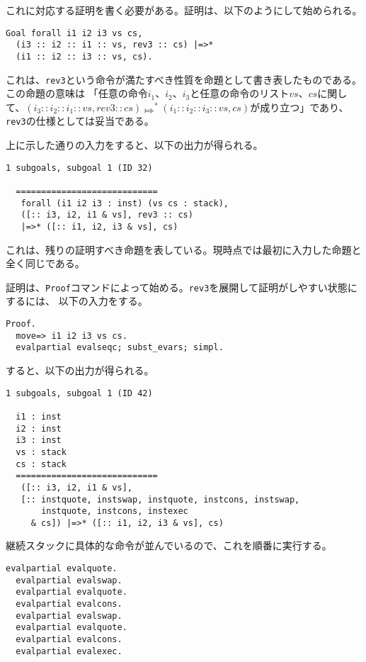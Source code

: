 \documentclass[a4paper, 10pt, twocolumn, titlepage]{ujarticle}
\renewcommand{\{}{\symbol{"7B}}
\renewcommand{\}}{\symbol{"7D}}
\begin{document}
これに対応する証明を書く必要がある。証明は、以下のようにして始められる。

\begin{lstlisting}[style=plain]
Goal forall i1 i2 i3 vs cs,
  (i3 :: i2 :: i1 :: vs, rev3 :: cs) |=>*
  (i1 :: i2 :: i3 :: vs, cs).
\end{lstlisting}

これは、\texttt{rev3}という命令が満たすべき性質を命題として書き表したものである。この命題の意味は
「任意の命令$i_1$、$i_2$、$i_3$と任意の命令のリスト$\mathit{vs}$、$\mathit{cs}$に関して、$(i_3 ::
i_2 :: i_1 :: \mathit{vs}, \mathit{rev3} :: \mathit{cs}) \Mapsto^* (i_1 :: i_2 :: i_3 ::
\mathit{vs}, \mathit{cs})$が成り立つ」であり、\texttt{rev3}の仕様としては妥当である。

上に示した通りの入力をすると、以下の出力が得られる。

\begin{lstlisting}[style=plain]
1 subgoals, subgoal 1 (ID 32)
  
  ============================
   forall (i1 i2 i3 : inst) (vs cs : stack),
   ([:: i3, i2, i1 & vs], rev3 :: cs)
   |=>* ([:: i1, i2, i3 & vs], cs)
\end{lstlisting}

これは、残りの証明すべき命題を表している。現時点では最初に入力した命題と全く同じである。

証明は、\texttt{Proof}コマンドによって始める。\texttt{rev3}を展開して証明がしやすい状態にするには、
以下の入力をする。

\begin{lstlisting}[style=plain]
Proof.
  move=> i1 i2 i3 vs cs.
  evalpartial evalseqc; subst_evars; simpl.
\end{lstlisting}

すると、以下の出力が得られる。

\begin{lstlisting}[style=plain]
1 subgoals, subgoal 1 (ID 42)
  
  i1 : inst
  i2 : inst
  i3 : inst
  vs : stack
  cs : stack
  ============================
   ([:: i3, i2, i1 & vs],
   [:: instquote, instswap, instquote, instcons, instswap,
       instquote, instcons, instexec
     & cs]) |=>* ([:: i1, i2, i3 & vs], cs)
\end{lstlisting}

継続スタックに具体的な命令が並んでいるので、これを順番に実行する。

\begin{lstlisting}[style=plain]
  evalpartial evalquote.
  evalpartial evalswap.
  evalpartial evalquote.
  evalpartial evalcons.
  evalpartial evalswap.
  evalpartial evalquote.
  evalpartial evalcons.
  evalpartial evalexec.
\end{lstlisting}
\end{document}
